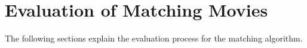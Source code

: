 \section{Evaluation of Matching Movies}
\label{sec_evaluation}

The following sections explain the evaluation process for the matching algorithm.


%